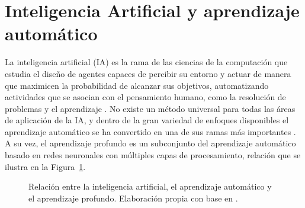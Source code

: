\section[INTELIGENCIA ARTIFICIAL Y APRENDIZAJE AUTOMÁTICO]{Inteligencia Artificial y aprendizaje
automático}

La inteligencia artificial (IA) es la rama de las ciencias de la computación que estudia el
diseño de agentes capaces de percibir su entorno y actuar de manera que maximicen la probabilidad
de alcanzar sus objetivos, automatizando actividades que se asocian con el pensamiento humano, como
la resolución de problemas y el aprendizaje \cite{russell2010}. No existe un método universal para
todas las áreas de aplicación de la IA, y dentro de la gran variedad de enfoques disponibles el
aprendizaje automático se ha convertido en una de sus ramas más importantes \cite{ertel2017}. A su
vez, el aprendizaje profundo es un subconjunto del aprendizaje automático basado en redes
neuronales con múltiples capas de procesamiento, relación que se ilustra en la
Figura~\ref{fig:ia}.

\begin{figure}[htbp]
\centering
{}
\caption{Relación entre la inteligencia artificial, el aprendizaje automático y el aprendizaje
profundo. Elaboración propia con base en \cite{goodfellow2016}.}
\label{fig:ia}
\end{figure}

